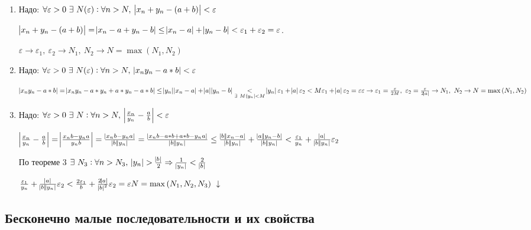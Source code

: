 \documentclass{article}
\begin{document}
    \begin{enumerate}
    	\item Надо: \(\forall \varepsilon > 0\ \exists\ N(\varepsilon) : \forall n > N,\ \abs{x_n + y_n - (a+b)} < \varepsilon\)
        
        \(\abs{x_n + y_n - (a+b)} = \abs{x_n - a + y_n - b} \leq \abs{x_n - a} + \abs{y_n - b} < \varepsilon_1 + \varepsilon_2 = \varepsilon\).
        
        \(\varepsilon \rightarrow \varepsilon_1,\ \varepsilon_2 \rightarrow N_1,\ N_2 \rightarrow N = \max{(N_1, N_2)}\)
        
        \item Надо: \(\forall \varepsilon > 0\ \exists\ N(\varepsilon) : \forall n > N,\ \abs{x_n y_n - a*b} < \varepsilon\)
        
        \(\abs{x_n y_n - a*b} = \abs{x_n y_n - a*y_n + a*y_n - a*b} \leq \abs{y_n} \abs{x_n - a} + \abs{a} \abs{y_n - b} \underset{\exists\ M : \abs{y_n} < M} < \abs{y_n} \varepsilon_1 + \abs{a} \varepsilon_2 < M \varepsilon_1 + \abs{a} \varepsilon_2 = \varepsilon\\
        \varepsilon \rightarrow \varepsilon_1 = \frac{\varepsilon}{2M},\ \varepsilon_2 = \frac{\varepsilon}{2 \abs{a}} \rightarrow N_1,\ N_2 \rightarrow N = \max{(N_1, N_2)}\)
        
        \item Надо: \(\forall \varepsilon > 0\ \exists\ N : \forall n > N,\ \abs{\frac{x_n}{y_n} - \frac{a}{b}} < \varepsilon\)
        
        \(\abs{\frac{x_n}{y_n} - \frac{a}{b}} = \abs{\frac{x_n b - y_n a}{y_n b}} = \frac{\abs{x_n b - y_n a}}{\abs{b} \abs{y_n}} = \frac{\abs{x_n b - a*b + a*b - y_n a}}{\abs{b} \abs{y_n}} \leq \frac{\abs{b} \abs{x_n - a}}{\abs{b} \abs{y_n}} +
        \frac{\abs{a} \abs{y_n - b}}{\abs{b} \abs{y_n}} < \frac{\varepsilon_1}{y_n} + \frac{\abs{a}}{\abs{b} \abs{y_n}} \varepsilon_2\)
        
        По теореме 3 \(\exists\ N_3 : \forall n > N_3,\ \abs{y_n} > \frac{\abs{b}}{2} \Rightarrow \frac{1}{\abs{y_n}} < \frac{2}{\abs{b}}\)
        
        \(\frac{\varepsilon_1}{y_n} + \frac{\abs{a}}{\abs{b} \abs{y_n}} \varepsilon_2 < \frac{2 \varepsilon_1}{b} + \frac{2 \abs{a}}{\abs{b}^2} \varepsilon_2 = \varepsilon\\ N = \max{(N_1, N_2, N_3)}\ \downarrow\)
    \end{enumerate}
    
    \subsection{Бесконечно малые последовательности и их свойства}
    
\end{document}
